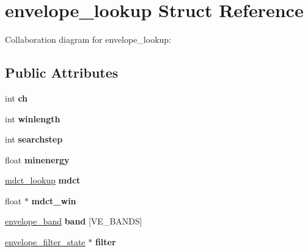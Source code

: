 \hypertarget{structenvelope__lookup}{\section{envelope\+\_\+lookup Struct Reference}
\label{structenvelope__lookup}
}


Collaboration diagram for envelope\+\_\+lookup\+:
\subsection*{Public Attributes}
\begin{DoxyCompactItemize}
\item 
\hypertarget{structenvelope__lookup_a5b6a11f7a3824c5c96d06319ef9a9b26}{int {\bfseries ch}}\label{structenvelope__lookup_a5b6a11f7a3824c5c96d06319ef9a9b26}

\item 
\hypertarget{structenvelope__lookup_a0dd3e4be45e14a1f562774245db3ba80}{int {\bfseries winlength}}\label{structenvelope__lookup_a0dd3e4be45e14a1f562774245db3ba80}

\item 
\hypertarget{structenvelope__lookup_aa06fe3f540bbf51b3046705730201dd2}{int {\bfseries searchstep}}\label{structenvelope__lookup_aa06fe3f540bbf51b3046705730201dd2}

\item 
\hypertarget{structenvelope__lookup_ac6bb522bcac62b0c384101da560729ac}{float {\bfseries minenergy}}\label{structenvelope__lookup_ac6bb522bcac62b0c384101da560729ac}

\item 
\hypertarget{structenvelope__lookup_a76d53a8e25d46b90080f89a14f798f59}{\hyperlink{structmdct__lookup}{mdct\+\_\+lookup} {\bfseries mdct}}\label{structenvelope__lookup_a76d53a8e25d46b90080f89a14f798f59}

\item 
\hypertarget{structenvelope__lookup_afdef34e306699f8959e2cd930b0a2f9d}{float $\ast$ {\bfseries mdct\+\_\+win}}\label{structenvelope__lookup_afdef34e306699f8959e2cd930b0a2f9d}

\item 
\hypertarget{structenvelope__lookup_af041a323f12911941c4fe57e3ec034e2}{\hyperlink{structenvelope__band}{envelope\+\_\+band} {\bfseries band} \mbox{[}V\+E\+\_\+\+B\+A\+N\+D\+S\mbox{]}}\label{structenvelope__lookup_af041a323f12911941c4fe57e3ec034e2}

\item 
\hypertarget{structenvelope__lookup_a452c1b6a0761208bba1eab35c46135c6}{\hyperlink{structenvelope__filter__state}{envelope\+\_\+filter\+\_\+state} $\ast$ {\bfseries filter}}\label{structenvelope__lookup_a452c1b6a0761208bba1eab35c46135c6}


\end{DoxyCompactItemize}
